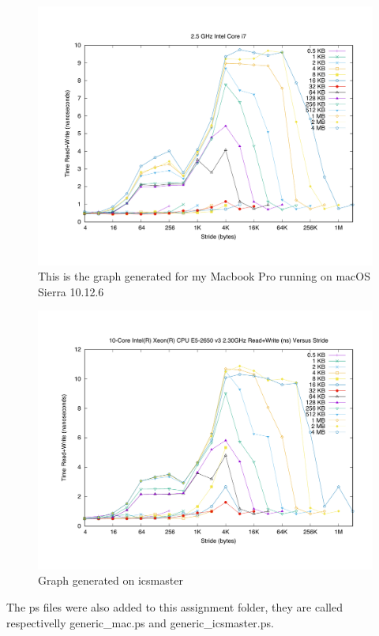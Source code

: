 \documentclass[unicode,11pt,a4paper,oneside,numbers=endperiod,openany]{scrartcl}
\begin{document}
\begin{enumerate}
        \begin{figure}[H]
            \includegraphics[width=\linewidth]{./membench/generic_mac.pdf}
            \caption{This is the graph generated for my Macbook Pro running on macOS Sierra 10.12.6}
        \end{figure}
        \begin{figure}[H]
            \includegraphics[width=\linewidth]{./membench/generic_icsmaster.pdf}
            \caption{Graph generated on icsmaster}
        \end{figure}
           
        The ps files were also added to this assignment folder, they are called respectivelly generic\_mac.ps and generic\_icsmaster.ps.


\end{enumerate}
\end{document}
